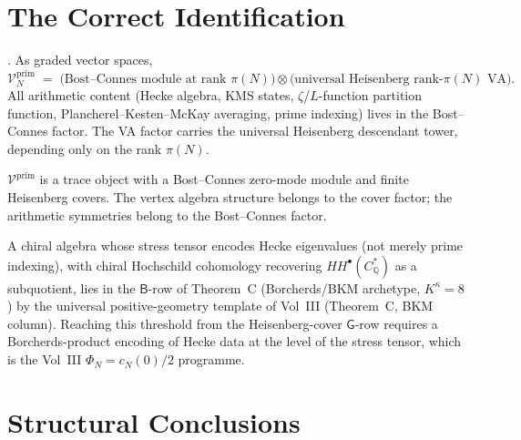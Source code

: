 \section{The Correct Identification}
\label{v4-arith:cs:correct-identification}

\begin{theorem}
\label{v4-arith:thm:CS-corrected-placement}
\ClaimStatusProvedHere. As graded vector spaces,
\begin{equation}
\mathcal{V}^{\mathrm{prim}}_{N}\;=\;\bigl(\text{Bost--Connes module at rank }\pi(N)\bigr)
\otimes\bigl(\text{universal Heisenberg rank-}\pi(N)\text{ VA}\bigr).
\end{equation}
All arithmetic content (Hecke algebra, KMS states,
\(\zeta\)/\(L\)-function partition function,
Plancherel--Kesten--McKay averaging, prime indexing) lives in the
Bost--Connes factor. The VA factor carries the universal Heisenberg
descendant tower, depending only on the rank \(\pi(N)\).
\end{theorem}

\begin{remark}
\(\mathcal{V}^{\mathrm{prim}}\) is a trace object with a Bost--Connes
zero-mode module and finite Heisenberg covers. The vertex algebra
structure belongs to the cover factor; the arithmetic symmetries belong
to the Bost--Connes factor.
\end{remark}

\begin{remark}
A chiral algebra whose stress tensor encodes Hecke eigenvalues
(not merely prime indexing), with chiral Hochschild cohomology
recovering \(HH^{\bullet}(C_{\mathbb{Q}}^{*})\) as a subquotient,
lies in the \(\mathsf{B}\)-row of Theorem~C (Borcherds/BKM archetype,
\(K^{\kappa}=8\)) by the universal positive-geometry template of Vol~III
(Theorem~C, BKM column). Reaching this threshold from
the Heisenberg-cover \(\mathsf{G}\)-row requires a Borcherds-product
encoding of Hecke data at the level of the stress tensor, which is the
Vol~III \(\Phi_{N}=c_{N}(0)/2\) programme.
\end{remark}

\section{Structural Conclusions}
\label{v4-arith:cs:summary}

